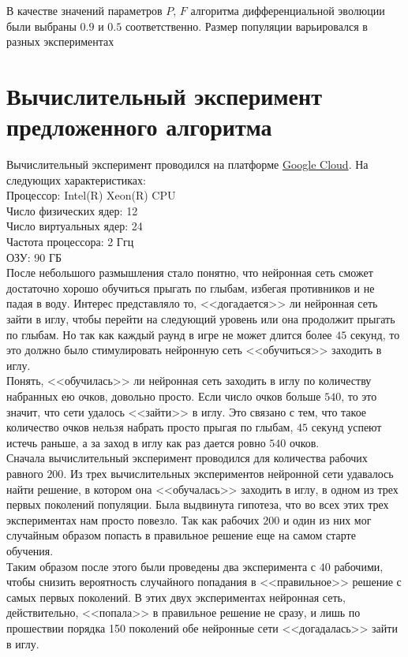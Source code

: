 \documentclass[12pt]{article}
\begin{document}
        В качестве значений параметров $P$, $F$ алгоритма дифференциальной эволюции были выбраны $0.9$ и $0.5$ соответственно. Размер популяции варьировался в разных экспериментах

\section{Вычислительный эксперимент предложенного алгоритма}
    Вычислительный эксперимент проводился на платформе \href{https://cloud.google.com/}{Google Cloud}. На следующих характеристиках: \\

    Процессор: Intel(R) Xeon(R) CPU \\
    Число физических ядер: 12 \\
    Число виртуальных ядер: 24 \\
    Частота процессора: 2 Ггц \\
    ОЗУ: 90 ГБ \\

    После небольшого размышления стало понятно, что нейронная сеть сможет достаточно хорошо обучиться прыгать по глыбам, избегая противников и не падая в воду. Интерес представляло то, <<догадается>> ли нейронная сеть зайти в иглу, чтобы перейти на следующий уровень или она продолжит прыгать по глыбам. Но так как каждый раунд в игре не может длится более $45$ секунд, то это должно было стимулировать нейронную сеть <<обучиться>> заходить в иглу. \\

    Понять, <<обучилась>> ли нейронная сеть заходить в иглу по количеству набранных ею очков, довольно просто. Если число очков больше $540$, то это значит, что сети удалось <<зайти>> в иглу. Это связано с тем, что такое количество очков нельзя набрать просто прыгая по глыбам, $45$ секунд успеют истечь раньше, а за заход в иглу как раз дается ровно $540$ очков. \\

    Сначала вычислительный эксперимент проводился для количества рабочих равного $200$. Из трех вычислительных экспериментов нейронной сети удавалось найти решение, в котором она <<обучалась>> заходить в иглу, в одном из трех первых поколений популяции. Была выдвинута гипотеза, что во всех этих трех экспериментах нам просто повезло. Так как рабочих $200$ и один из них мог случайным образом попасть в правильное решение еще на самом старте обучения. \\

    Таким образом после этого были проведены два эксперимента с $40$ рабочими, чтобы снизить вероятность случайного попадания в <<правильное>> решение с самых первых поколений. В этих двух экспериментах нейронная сеть, действительно, <<попала>> в правильное решение не сразу, и лишь по прошествии порядка 150 поколений обе нейронные сети <<догадалась>> зайти в иглу. \\
\end{document}
